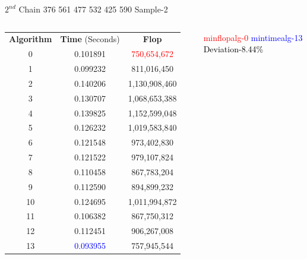 \documentclass[10pts]{beamer}
\begin{document}
	    \begin{frame}{$2^{nd}$ Chain 376 561 477 532 425 590 \hspace{75pt}   Sample-2 }
	    	\begin{columns}
	    		
	    		\begin{tabular}{c | c | c}
	    			\textbf{Algorithm}  & \textbf{Time} (Seconds) & \textbf{Flop}\\		
	    			0 & 0.101891 &\textcolor{red}{750,654,672}\\ 		
	    			1 &	0.099232 &	811,016,450 \\	
	    			2 &	0.140206 &	1,130,908,460 \\		
	    			3 &	0.130707 &	1,068,653,388\\
	    			4 &	0.139825 &	1,152,599,048 \\		
	    			5 &	0.126232 &	1,019,583,840	\\	
	    			6 &	0.121548 &	973,402,830 	\\	
	    			7 &	0.121522 &	979,107,824	\\	
	    			8 &	0.110458 &	867,783,204	\\	
	    			9 &	0.112590 &	894,899,232 	\\	
	    			10 &	0.124695 &	1,011,994,872 \\		
	    			11 &	0.106382 &	867,750,312 	\\	
	    			12 &	0.112451 &	906,267,008 	\\	
	    			13 &    \textcolor{blue}{0.093955} &757,945,544 		
	    			
	    		\end{tabular}
	    		
	    		
	    		\textcolor{red}{min\textunderscore flop\textunderscore alg-0}
	    		\textcolor{blue}{min\textunderscore time\textunderscore alg-13}
	    		\textcolor{black}{Deviation-8.44\%}
	    	\end{columns}
	    \end{frame} 
	    
	    
	    
\end{document}
